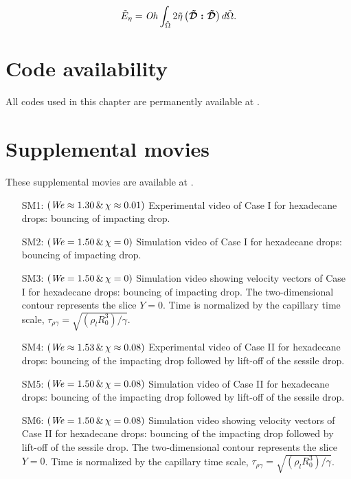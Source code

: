 \begin{subappendices}
	\begin{align}
		\label{ChDoD:eq:VisDissFnct}
		\tilde{E}_\eta = \mathit{Oh}\int_{\tilde{\Omega}}2\tilde{\eta}\left(\boldsymbol{\tilde{\mathcal{D}}:\tilde{\mathcal{D}}}\right)d\tilde{\Omega}.
	\end{align}
	
	\section{Code availability}
	
	All codes used in this chapter are permanently available at \citet{basiliskvatsalDoD}.
	
	\section{Supplemental movies}
	These supplemental movies are available at \citet[\href{https://youtube.com/playlist?list=PLf5C5HCrvhLEX9_VlqlK99mdtxtu1l-HQ}{external YouTube link,}][]{vatsalDoDsuppl}. 
	
	\begin{enumerate}
		\item[SM1:] $\left(\mathit{We} \approx 1.30\,\&\,\chi \approx 0.01\right)$ Experimental video of Case I for hexadecane drops: bouncing of impacting drop.
		\item[SM2:] $\left(\mathit{We} = 1.50\,\&\,\chi = 0\right)$ Simulation video of Case I for hexadecane drops: bouncing of impacting drop.
		\item[SM3:] $\left(\mathit{We} = 1.50\,\&\,\chi = 0\right)$ Simulation video showing velocity vectors of Case I for hexadecane drops: bouncing of impacting drop. The two-dimensional contour represents the slice $Y = 0$. Time is normalized by the capillary time scale, $\tau_{\rho\gamma} = \sqrt{\left(\rho_l R_0^3\right)/\gamma}$.
		
		\item[SM4:] $\left(\mathit{We} \approx 1.53\,\&\,\chi \approx 0.08\right)$ Experimental video of Case II for hexadecane drops: bouncing of the impacting drop followed by lift-off of the sessile drop.
		\item[SM5:] $\left(\mathit{We} = 1.50\,\&\,\chi = 0.08\right)$ Simulation video of Case II for hexadecane drops: bouncing of the impacting drop followed by lift-off of the sessile drop.
		\item[SM6:] $\left(\mathit{We} = 1.50\,\&\,\chi = 0.08\right)$ Simulation video showing velocity vectors of Case II for hexadecane drops: bouncing of the impacting drop followed by lift-off of the sessile drop. The two-dimensional contour represents the slice $Y = 0$. Time is normalized by the capillary time scale, $\tau_{\rho\gamma} = \sqrt{\left(\rho_l R_0^3\right)/\gamma}$.
		

\end{enumerate}
\end{subappendices}
